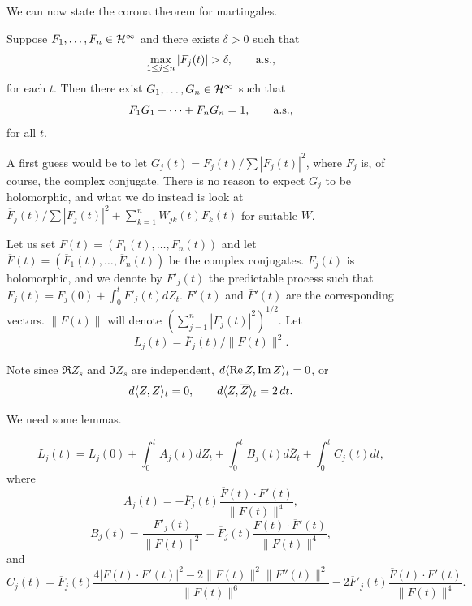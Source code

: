 We can now state the corona theorem for martingales.

\begin{theorem}\label{thm:ch5_6.7}
Suppose $F_1,\ldots,F_n \in \mathcal{H}^\infty$ and there exists $\delta > 0$ such that
\[
    \max_{1\leq j\leq n} |F_j(t)| > \delta, \qquad \textnormal{a.s.},
\]
for each $t$. Then there exist $G_1,\ldots,G_n \in \mathcal{H}^\infty$ such that
\[
    F_1G_1 + \cdots + F_nG_n = 1, \qquad \textnormal{a.s.},
\]
for all $t$.
\end{theorem}

A first guess would be to let $G_j(t) = \overline{F}_j(t)/\sum|F_j(t)|^2$, where $\overline{F}_j$ is, of course, the complex conjugate. There is no reason to expect $G_j$ to be holomorphic, and what we do instead is look at $\overline{F}_j(t)/\sum|F_j(t)|^2 + \sum_{k=1}^n W_{jk}(t)F_k(t)$ for suitable $W$.

Let us set $F(t) = (F_1(t),\ldots,F_n(t))$ and let $\overline{F}(t) = (\overline{F}_1(t),\ldots,\overline{F}_n(t))$ be the complex conjugates. $F_j(t)$ is holomorphic, and we denote by $F'_j(t)$ the predictable process such that $F_j(t) = F_j(0) + \int_0^t F'_j(t) dZ_t$. $F'(t)$ and $\overline{F}'(t)$ are the corresponding vectors. $\|F(t)\|$ will denote $(\sum_{j=1}^n |F_j(t)|^2)^{1/2}$. Let
\begin{equation}\label{eq:ch5_6.8}
    L_j(t) = \overline{F}_j(t)/\|F(t)\|^2.
\end{equation}

Note since $\Re Z_s$ and $\Im Z_s$ are independent, $d\langle \operatorname{Re} Z,\operatorname{Im} Z \rangle_t = 0$, or
\begin{equation}\label{eq:ch5_6.9}
    d\langle Z,Z \rangle_t = 0, \qquad d\langle Z,\overline{Z} \rangle_t = 2\,dt.
\end{equation}

We need some lemmas.

\begin{lemma}\label{lem:ch5_6.8}
\[
    L_j(t) = L_j(0) + \int_0^t A_j(t)dZ_t + \int_0^t B_j(t)d\overline{Z}_t + \int_0^t C_j(t)dt,
\]
where
\[
    A_j(t) = -\overline{F}_j(t)\frac{\overline{F}(t) \cdot F'(t)}{\|F(t)\|^4},
\]
\[
    B_j(t) = \frac{F'_j(t)}{\|F(t)\|^2} - \overline{F}_j(t)\frac{F(t) \cdot \overline{F}'(t)}{\|F(t)\|^4},
\]
and
\[
    C_j(t) = \overline{F}_j(t)\frac{4|F(t) \cdot F'(t)|^2 - 2\|F(t)\|^2\|F''(t)\|^2}{\|F(t)\|^6} - 2\overline{F}'_j(t)\frac{\overline{F}(t) \cdot F'(t)}{\|F(t)\|^4}.
\]
\end{lemma}

